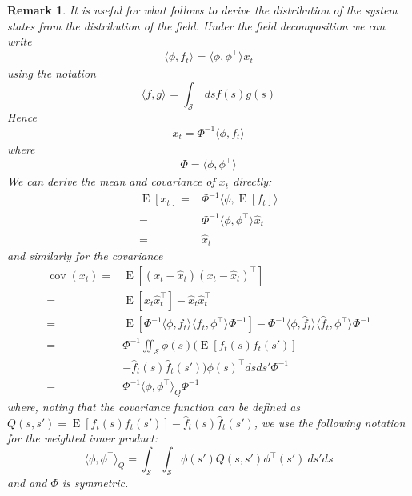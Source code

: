 \documentclass{IEEEtran}
\newcommand{\inner}[3]{\langle#1,#2\rangle_{#3}}
\DeclareMathOperator{\E}{E}
\DeclareMathOperator{\cov}{cov}
\newtheorem{remark}{Remark}
\begin{document}
\begin{remark}
	It is useful for what follows to derive the distribution of the system states from the distribution of the field. Under the field decomposition we can write
\begin{equation}
	\inner{\phi}{f_t}{} = \inner{\phi}{\phi^\top}{} x_t
\end{equation}
using the notation
\begin{equation}
	\inner{f}{g}{} = \int_\mathcal{S} ~ds f(s) g(s)
\end{equation}
Hence
\begin{equation}
	x_t = \Phi^{-1}\inner{\phi}{f_t}{}
\end{equation}
where
\begin{equation}
		\Phi = \inner{\phi}{\phi^\top}{}
\end{equation}
We can derive the mean and covariance of $x_t$ directly:
\begin{equation}
	\begin{split}
	\E[x_t] = & \Phi^{-1} \inner{\phi}{\E[f_t]}{} \\
	= & \Phi^{-1} \inner{\phi}{\phi^\top}{} \hat{x}_t \\
	= & \hat{x}_t
	\end{split}
\end{equation}
and similarly for the covariance\cite{Scerri09}
\begin{equation}
	\label{eqn:covx}
	\begin{split}
	\cov(x_t)  = & \E[(x_t - \hat{x}_t)(x_t - \hat{x}_t)^\top] \\
	 = & \E[x_t\hat{x}_t^\top] - \hat{x}_t\hat{x}_t^\top \\
	 = &  \E[\Phi^{-1}\inner{\phi}{f_t}{}\inner{f_t}{\phi^\top}{}\Phi^{-1}] 
	  -  \Phi^{-1}\inner{\phi}{\hat{f}_t}{}\inner{\hat{f}_t}{\phi^\top}{}\Phi^{-1}
	\\
	 = &\Phi^{-1} \iint_\mathcal{S} \phi(s) (\E[f_t(s) f_t(s')] \\
	 & -\hat{f}_t(s)\hat{f}_t(s')) \phi(s)^\top ds ds' \Phi^{-1} \\
	 = &\Phi^{-1} \inner{\phi}{\phi^\top}{Q} \Phi^{-1}
	\end{split}
\end{equation}
where, noting that the covariance function can be defined as $Q(s,s')=\E[f_t(s) f_t(s')] -\hat{f}_t(s)\hat{f}_t(s')$, we use the following notation for the weighted inner product:
\begin{equation}
	\inner{\phi}{\phi^\top}{Q} = \int_\mathcal{S}\int_\mathcal{S}  \phi(s') Q(s,s') \phi^\top(s') ~ds'ds
\end{equation}
and  and $\Phi$ is symmetric.	
\end{remark}
\end{document}
